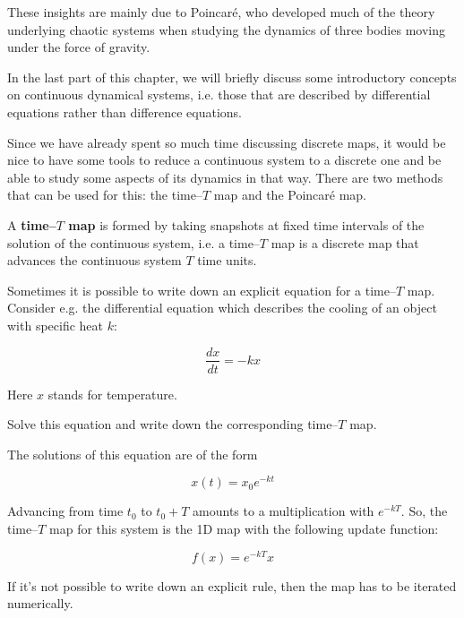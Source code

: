 These insights are mainly due to Poincar\'{e}, who developed much of the theory underlying chaotic systems when studying the dynamics of three bodies moving under the force of gravity.

\pagebreak


In the last part of this chapter, we will briefly discuss some introductory concepts on continuous dynamical systems, i.e. those that are described by differential equations rather than difference equations.

Since we have already spent so much time discussing discrete maps, it would be nice to have some tools to reduce a continuous system to a discrete one and be able to study some aspects of its dynamics in that way. There are two methods that can be used for this: the time--$T$ map and the Poincar\'{e} map.

A \textbf{time--$T$ map} is formed by taking snapshots at fixed time intervals of the solution of the continuous system, i.e. a time--$T$ map is a discrete map that advances the continuous system $T$ time units. 

Sometimes it is possible to write down an explicit equation for a time--$T$ map. Consider e.g. the differential equation which describes the cooling of an object with specific heat $k$:

\begin{equation}
\frac{dx}{dt} = -k x
\end{equation} 

Here $x$ stands for temperature.

\begin{cue}
Solve this equation and write down the corresponding time--$T$ map.  
\end{cue}

The solutions of this equation are of the form

\begin{equation}
x(t) = x_0 e^{-kt}
\end{equation} 

Advancing from time $t_0$ to $t_0+T$ amounts to a multiplication with $e^{-kT}$. So, the time--$T$ map for this system is the 1D map with the following update function:

\begin{equation}
f(x) = e^{-kT} x
\end{equation} 

If it's not possible to write down an explicit rule, then the map has to be iterated numerically.

